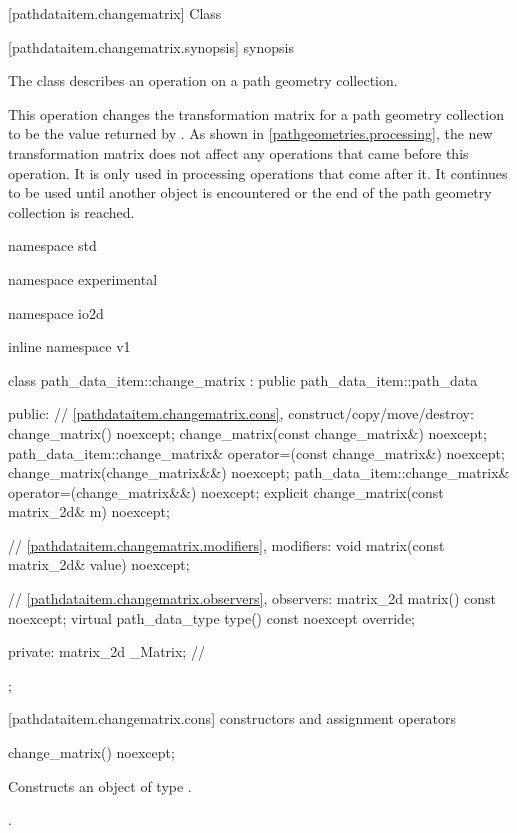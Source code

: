  [pathdataitem.changematrix] {Class }

 [pathdataitem.changematrix.synopsis] { synopsis}

\pnum
{}
The class  describes an operation on a path geometry collection.

\pnum
This operation changes the transformation matrix for a path geometry collection to be the value returned by . As shown in \ref{pathgeometries.processing}, the new transformation matrix does not affect any operations that came before this operation. It is only used in processing operations that come after it. It continues to be used until another  object is encountered or the end of the path geometry collection is reached.

\begin{codeblock}
namespace std { namespace experimental { namespace io2d { inline namespace v1 {
  class path_data_item::change_matrix : public path_data_item::path_data {
  public:
    // \ref{pathdataitem.changematrix.cons}, construct/copy/move/destroy:
    change_matrix() noexcept;
    change_matrix(const change_matrix&) noexcept;
    path_data_item::change_matrix& operator=(const change_matrix&) noexcept;
    change_matrix(change_matrix&&) noexcept;
    path_data_item::change_matrix& operator=(change_matrix&&) noexcept;
    explicit change_matrix(const matrix_2d& m) noexcept;

    // \ref{pathdataitem.changematrix.modifiers}, modifiers:
    void matrix(const matrix_2d& value) noexcept;

    // \ref{pathdataitem.changematrix.observers}, observers:
    matrix_2d matrix() const noexcept;
    virtual path_data_type type() const noexcept override;
    
  private:
    matrix_2d _Matrix; // \expos
  };
} } } }
\end{codeblock}

 [pathdataitem.changematrix.cons] { constructors and assignment operators}

\begin{itemdecl}
    change_matrix() noexcept;
\end{itemdecl}
\begin{itemdescr}
	\pnum
	\effects
	Constructs an object of type .
	
	\pnum
	\postconditions
	.
\end{itemdescr}

